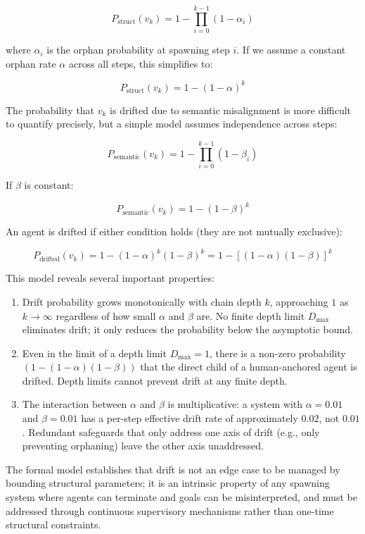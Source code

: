 \[
P_{\text{struct}}(v_k) = 1 - \prod_{i=0}^{k-1} (1 - \alpha_i)
\]

where $\alpha_i$ is the orphan probability at spawning step $i$. If we assume a constant orphan rate $\alpha$ across all steps, this simplifies to:

\[
P_{\text{struct}}(v_k) = 1 - (1 - \alpha)^k
\]

The probability that $v_k$ is drifted due to semantic misalignment is more difficult to quantify precisely, but a simple model assumes independence across steps:

\[
P_{\text{semantic}}(v_k) = 1 - \prod_{i=0}^{k-1} (1 - \beta_i)
\]

If $\beta$ is constant:

\[
P_{\text{semantic}}(v_k) = 1 - (1 - \beta)^k
\]

An agent is drifted if either condition holds (they are not mutually exclusive):

\[
P_{\text{drifted}}(v_k) = 1 - (1 - \alpha)^k (1 - \beta)^k = 1 - [(1 - \alpha)(1 - \beta)]^k
\]

This model reveals several important properties:

\begin{enumerate}
    \item Drift probability grows monotonically with chain depth $k$, approaching $1$ as $k \to \infty$ regardless of how small $\alpha$ and $\beta$ are. No finite depth limit $D_{\max}$ eliminates drift; it only reduces the probability below the asymptotic bound.
    \item Even in the limit of a depth limit $D_{\max} = 1$, there is a non-zero probability $(1 - (1 - \alpha)(1 - \beta))$ that the direct child of a human-anchored agent is drifted. Depth limits cannot prevent drift at any finite depth.
    \item The interaction between $\alpha$ and $\beta$ is multiplicative: a system with $\alpha = 0.01$ and $\beta = 0.01$ has a per-step effective drift rate of approximately $0.02$, not $0.01$. Redundant safeguards that only address one axis of drift (e.g., only preventing orphaning) leave the other axis unaddressed.
\end{enumerate}

The formal model establishes that drift is not an edge case to be managed by bounding structural parameters; it is an intrinsic property of any spawning system where agents can terminate and goals can be misinterpreted, and must be addressed through continuous supervisory mechanisms rather than one-time structural constraints.
